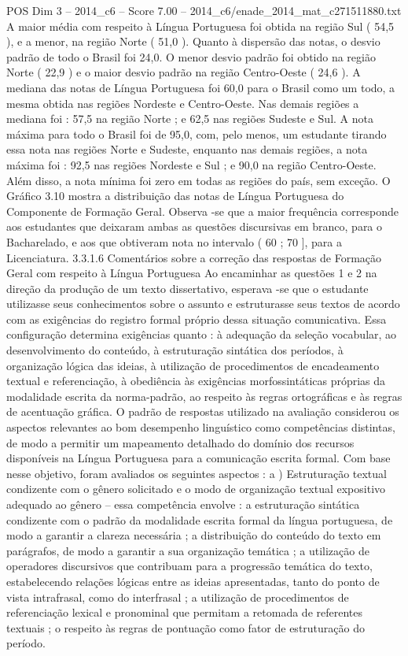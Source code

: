 \begin{textsample}{POS Dim 3 – 2014\_c6 – Score 7.00 – 2014\_c6/enade\_2014\_mat\_c271511880.txt}
A maior média com respeito à Língua Portuguesa foi obtida na região Sul ( 54,5 ), e a menor, na região Norte ( 51,0 ).
Quanto à dispersão das notas, o desvio padrão de todo o Brasil foi 24,0.
O menor desvio padrão foi obtido na região Norte ( 22,9 ) e o maior desvio padrão na região Centro-Oeste ( 24,6 ).
A mediana das notas de Língua Portuguesa foi 60,0 para o Brasil como um todo, a mesma obtida nas regiões Nordeste e Centro-Oeste.
Nas demais regiões a mediana foi : 57,5 na região Norte ; e 62,5 nas regiões Sudeste e Sul.
A nota máxima para todo o Brasil foi de 95,0, com, pelo menos, um estudante tirando essa nota nas regiões Norte e Sudeste, enquanto nas demais regiões, a nota máxima foi : 92,5 nas regiões Nordeste e Sul ; e 90,0 na região Centro-Oeste.
Além disso, a nota mínima foi zero em todas as regiões do país, sem exceção.
O Gráfico 3.10 mostra a distribuição das notas de Língua Portuguesa do Componente de Formação Geral.
Observa -se que a maior frequência corresponde aos estudantes que deixaram ambas as questões discursivas em branco, para o Bacharelado, e aos que obtiveram nota no intervalo ( 60 ; 70 ], para a Licenciatura. 3.3.1.6 Comentários sobre a correção das respostas de Formação Geral com respeito à Língua Portuguesa Ao encaminhar as questões 1 e 2 na direção da produção de um texto dissertativo, esperava -se que o estudante utilizasse seus conhecimentos sobre o assunto e estruturasse seus textos de acordo com as exigências do registro formal próprio dessa situação comunicativa.
Essa configuração determina exigências quanto : à adequação da seleção vocabular, ao desenvolvimento do conteúdo, à estruturação sintática dos períodos, à organização lógica das ideias, à utilização de procedimentos de encadeamento textual e referenciação, à obediência às exigências morfossintáticas próprias da modalidade escrita da norma-padrão, ao respeito às regras ortográficas e às regras de acentuação gráfica.
O padrão de respostas utilizado na avaliação considerou os aspectos relevantes ao bom desempenho linguístico como competências distintas, de modo a permitir um mapeamento detalhado do domínio dos recursos disponíveis na Língua Portuguesa para a comunicação escrita formal.
Com base nesse objetivo, foram avaliados os seguintes aspectos : a ) Estruturação textual condizente com o gênero solicitado e o modo de organização textual expositivo adequado ao gênero – essa competência envolve : a estruturação sintática condizente com o padrão da modalidade escrita formal da língua portuguesa, de modo a garantir a clareza necessária ; a distribuição do conteúdo do texto em parágrafos, de modo a garantir a sua organização temática ; a utilização de operadores discursivos que contribuam para a progressão temática do texto, estabelecendo relações lógicas entre as ideias apresentadas, tanto do ponto de vista intrafrasal, como do interfrasal ; a utilização de procedimentos de referenciação lexical e pronominal que permitam a retomada de referentes textuais ; o respeito às regras de pontuação como fator de estruturação do período.

\end{textsample}

